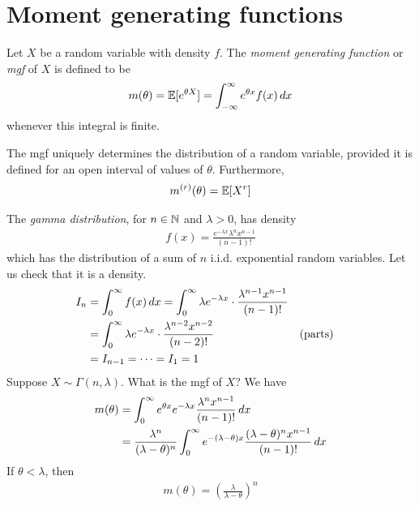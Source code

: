 \documentclass{../template/note}
\begin{document}
    \section{Moment generating functions}

    \begin{definition}
        Let \(X\) be a random variable with density \(f\). The \emph{moment generating function} or \emph{mgf} of \(X\) is defined to be
        \begin{align*}
            m(\theta) = \mathbb E[e^{\theta X}] = \int_{-\infty}^\infty e^{\theta x}f(x) \,d{x}
        \end{align*}
        whenever this integral is finite.            
    \end{definition}

    \begin{theorem}
        The mgf uniquely determines the distribution of a random variable, provided it is defined for an open interval of values of \(\theta\). Furthermore,
        \begin{align*}
            m^{(r)}(\theta) = \mathbb E[X^r]
        \end{align*}
    \end{theorem}
    
    \begin{example*}
        The \emph{gamma distribution}, for \(n \in \mathbb N\) and \(\lambda > 0\), has density
        \begin{align*}
            f(x) = \frac{e^{-\lambda x}\lambda^nx^{n-1}}{(n-1)!}
        \end{align*}
        which has the distribution of a sum of \(n\) i.i.d. exponential random variables. Let us check that it is a density.
        \begin{align*}
            I_n &= \int_0^\infty f(x) \,d{x} = \int_0^{\infty} \lambda e^{-\lambda x} \cdot \frac{\lambda^{n-1}x^{n-1}}{(n-1)!} \\
            &= \int_0^\infty \lambda e^{-\lambda x} \cdot \frac{\lambda^{n-2}x^{n-2}}{(n-2)!} && \text{(parts)} \\
            &= I_{n-1} = \cdots = I_1 = 1
        \end{align*}
        Suppose \(X \sim \Gamma(n, \lambda)\). What is the mgf of \(X\)? We have
        \begin{align*}
            m(\theta) &= \int_0^\infty e^{\theta x}e^{-\lambda x} \frac{\lambda^n x^{n-1}}{(n-1)!} \,d{x} \\
            &= \frac{\lambda^n}{(\lambda-\theta)^n}\int_0^\infty e^{-(\lambda-\theta)x} \frac{(\lambda-\theta)^nx^{n-1}}{(n-1)!} \,d{x} 
        \end{align*}
        If \(\theta < \lambda\), then
        \begin{align*}
            m(\theta) = \left(\frac{\lambda}{\lambda-\theta}\right)^n
        \end{align*}
    \end{example*}
\end{document}
